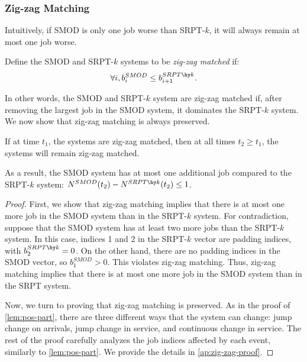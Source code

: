 \documentclass[acmsmall]{acmart}
\begin{document}
\subsubsection{Zig-zag Matching}
\label{sec:zig-zag}

Intuitively, if SMOD is only one job worse than SRPT-$k$, it will always remain at most one job worse. 

\begin{definition} 
    \label{def:zig-zag}
Define the SMOD and SRPT-$k$ systems to be \emph{zig-zag matched} if:
\begin{align*}
    \forall i, b_i^{SMOD} \le b_{i+1}^{SRPT\hy k}.
\end{align*}
\end{definition}

In other words, the SMOD and SRPT-$k$ system are zig-zag matched if, after removing the largest job in the SMOD system, it dominates the SRPT-$k$ system. 
We now show that zig-zag matching is always preserved.

\begin{lemma}
    \label{lem:zig-zag}
    If at time $t_1$, the systems are zig-zag matched,
    then at all times $t_2 \ge t_1$, the systems will remain zig-zag matched.

    As a result, the SMOD system has at most one additional job compared to the SRPT-$k$ system: $N^{SMOD}(t_2) - N^{SRPT\hy k}(t_2) \le 1$.
\end{lemma}


\begin{proof}
    First, we show that zig-zag matching implies that there is at most one more job in the SMOD system than in the SRPT-$k$ system.
    For contradiction, suppose that the SMOD system has at least two more jobs than the SRPT-$k$ system.
    In this case, indices 1 and 2 in the SRPT-$k$ vector are padding indices, with $b^{SRPT\hy k}_2 = 0$.
    On the other hand, there are no padding indices in the SMOD vector,
    so $b^{SMOD}_1 > 0$. This violates zig-zag matching.
    Thus, zig-zag matching implies that there is at most one more job in the SMOD system than in the SRPT system.

    Now, we turn to proving that zig-zag matching is preserved.
    As in the proof of \cref{lem:pos-part},
    there are three different ways that the system can change: jump change on arrivals, jump change in service, and continuous change in service. The rest of the proof carefully analyzes the job indices affected by each event, similarly to \cref{lem:pos-part}. We provide the details in \cref{ap:zig-zag-proof}.
\end{proof}
\end{document}

